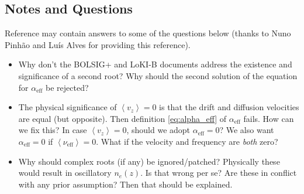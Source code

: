 \documentclass{book}
\newcommand{\MEAN}[1]{\ensuremath{\!\left\langle{{#1}}\right\rangle}}
\begin{document}
\subsection{Notes and Questions}
Reference \cite{Blevin1984} may contain answers to some of the questions below
(thanks to Nuno Pinh\~ao and Lu\'is Alves for providing this reference).
\begin{itemize}
\item Why don't the BOLSIG+ and LoKI-B documents address the existence and significance of a second root?
	Why should the second solution of the equation for $\alpha_{\text{eff}}$ be rejected?
\item The physical significance of $\MEAN{v_z}=0$ is that the drift and diffusion
	velocities are equal (but opposite). Then definition \eqref{eq:alpha_eff}
	of $\alpha_{\text{eff}}$ fails. How can we fix this?
	In case $\MEAN{v_z}=0$, should we adopt $\alpha_{\text{eff}}=0$? We
	also want $\alpha_{\text{eff}}=0$ if $\MEAN{\nu_{\text{eff}}}=0$.
	What if the velocity and frequency are {\em both} zero?
\item Why should complex roots (if any) be ignored/patched? Physically
	these would result in oscillatory $n_e(z)$. Is that wrong per se?
	Are these in conflict with any prior assumption? Then that should be
	explained.
\end{itemize}
\end{document}
